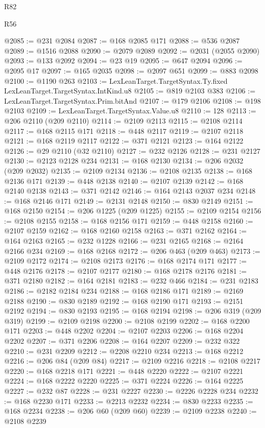 \begin{lexlean}{R82}
\begin{lexlean}{R56}
\begin{coremodule}
{{{{{{{{{{{{{{{{{{{{{{{{{{{{{{{{{{{{{{{{{{{{{{{{{{{{{{{{{{{{{{{{{{{{{{{{{{{{{{{{{{{{{{{{{{{{{{{{{{{{{{{{{{{{{{{{{{{{{{{{{{{{{{{{{{{{{{{{{{{{{{{{{{{{{{{{{{{{{{{{{{{{{{{{{{{{{{{{{{{{{{{{{{{{{{{{{{{{{{{{{{{{{{{{{{{@2085 := @231 @2084
@2087 := @168 @2085 @171
@2088 := @536 @2087
@2089 := @1516 @2088
@2090 := @2079 @2089
@2092 := @2031 (@2055 @2090)
@2093 := @133 @2092
@2094 := @23 @19
@2095 := @647 @2094
@2096 := @2095 @17
@2097 := @165 @2035
@2098 := @2097 @651
@2099 := @883 @2098
@2100 := @1190 @263
@2103 := LexLeanTarget.TargetSyntax.Ty.fixed LexLeanTarget.TargetSyntax.IntKind.u8
@2105 := @819 @2103 @383
@2106 := LexLeanTarget.TargetSyntax.Prim.bitAnd
@2107 := @179 @2106
@2108 := @198 @2103
@2109 := LexLeanTarget.TargetSyntax.Value.u8
@2110 := 128
@2113 := @206 @2110 (@209 @2110)
@2114 := @2109 @2113
@2115 := @2108 @2114
@2117 := @168 @2115 @171
@2118 := @448 @2117
@2119 := @2107 @2118
@2121 := @168 @2119 @2117
@2122 := @371 @2121
@2123 := @164 @2122
@2126 := @29 @2110 (@32 @2110)
@2127 := @232 @2126
@2128 := @231 @2127
@2130 := @2123 @2128 @234
@2131 := @168 @2130
@2134 := @206 @2032 (@209 @2032)
@2135 := @2109 @2134
@2136 := @2108 @2135
@2138 := @168 @2136 @171
@2139 := @448 @2138
@2140 := @2107 @2139
@2142 := @168 @2140 @2138
@2143 := @371 @2142
@2146 := @164 @2143 @2037 @234
@2148 := @168 @2146 @171
@2149 := @2131 @2148
@2150 := @830 @2149
@2151 := @168 @2150
@2154 := @206 @1225 (@209 @1225)
@2155 := @2109 @2154
@2156 := @2108 @2155
@2158 := @168 @2156 @171
@2159 := @448 @2158
@2160 := @2107 @2159
@2162 := @168 @2160 @2158
@2163 := @371 @2162
@2164 := @164 @2163
@2165 := @232 @1228
@2166 := @231 @2165
@2168 := @2164 @2166 @234
@2169 := @168 @2168
@2172 := @206 @463 (@209 @463)
@2173 := @2109 @2172
@2174 := @2108 @2173
@2176 := @168 @2174 @171
@2177 := @448 @2176
@2178 := @2107 @2177
@2180 := @168 @2178 @2176
@2181 := @371 @2180
@2182 := @164 @2181
@2183 := @232 @466
@2184 := @231 @2183
@2186 := @2182 @2184 @234
@2188 := @168 @2186 @171
@2189 := @2169 @2188
@2190 := @830 @2189
@2192 := @168 @2190 @171
@2193 := @2151 @2192
@2194 := @830 @2193
@2195 := @168 @2194
@2198 := @206 @319 (@209 @319)
@2199 := @2109 @2198
@2200 := @2108 @2199
@2202 := @168 @2200 @171
@2203 := @448 @2202
@2204 := @2107 @2203
@2206 := @168 @2204 @2202
@2207 := @371 @2206
@2208 := @164 @2207
@2209 := @232 @322
@2210 := @231 @2209
@2212 := @2208 @2210 @234
@2213 := @168 @2212
@2216 := @206 @84 (@209 @84)
@2217 := @2109 @2216
@2218 := @2108 @2217
@2220 := @168 @2218 @171
@2221 := @448 @2220
@2222 := @2107 @2221
@2224 := @168 @2222 @2220
@2225 := @371 @2224
@2226 := @164 @2225
@2227 := @232 @87
@2228 := @231 @2227
@2230 := @2226 @2228 @234
@2232 := @168 @2230 @171
@2233 := @2213 @2232
@2234 := @830 @2233
@2235 := @168 @2234
@2238 := @206 @60 (@209 @60)
@2239 := @2109 @2238
@2240 := @2108 @2239
}}}}}}}}}}}}}}}}}}}}}}}}}}}}}}}}}}}}}}}}}}}}}}}}}}}}}}}}}}}}}}}}}}}}}}}}}}}}}}}}}}}}}}}}}}}}}}}}}}}}}}}}}}}}}}}}}}}}}}}}}}}}}}}}}}}}}}}}}}}}}}}}}}}}}}}}}}}}}}}}}}}}}}}}}}}}}}}}}}}}}}}}}}}}}}}}}}}}}}}}}}}}}}}}}}}
\end{coremodule}
\end{lexlean}
\end{lexlean}
